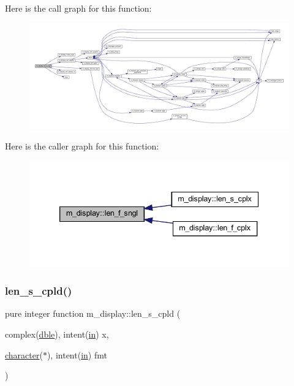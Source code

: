 Here is the call graph for this function\+:
\nopagebreak
\begin{figure}[H]
\begin{center}
\leavevmode
\includegraphics[width=350pt]{namespacem__display_ae0feb946fbc4c31f8ba53e20719fa508_cgraph}
\end{center}
\end{figure}
Here is the caller graph for this function\+:
\nopagebreak
\begin{figure}[H]
\begin{center}
\leavevmode
\includegraphics[width=339pt]{namespacem__display_ae0feb946fbc4c31f8ba53e20719fa508_icgraph}
\end{center}
\end{figure}
\mbox{\label{namespacem__display_ace35690c2f36e28f07336cc7dcff47f4}} 
\subsubsection{\texorpdfstring{len\+\_\+s\+\_\+cpld()}{len\_s\_cpld()}}
{\footnotesize\ttfamily pure integer function m\+\_\+display\+::len\+\_\+s\+\_\+cpld (\begin{DoxyParamCaption}\item[{complex(\hyperlink{namespacem__display_a46d90b75b6ccef7ccade133e5847e815}{dble}), intent(\hyperlink{M__journal_83_8txt_afce72651d1eed785a2132bee863b2f38}{in})}]{x,  }\item[{\hyperlink{option__stopwatch_83_8txt_abd4b21fbbd175834027b5224bfe97e66}{character}($\ast$), intent(\hyperlink{M__journal_83_8txt_afce72651d1eed785a2132bee863b2f38}{in})}]{fmt }\end{DoxyParamCaption})\hspace{0.3cm}{\ttfamily [private]}}



